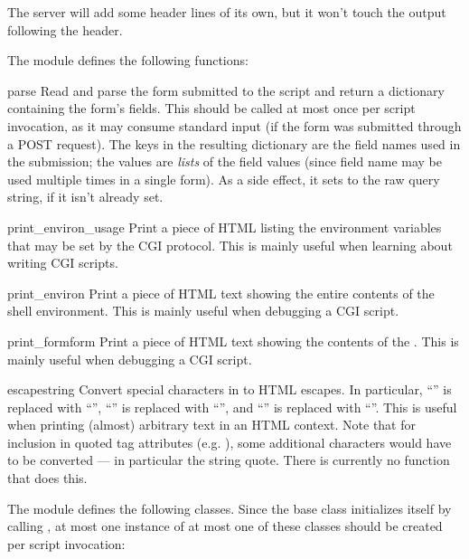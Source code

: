 The server will add some header lines of its own, but it won't touch
the output following the header.

The  module defines the following functions:

\begin{funcdesc}{parse}{}
Read and parse the form submitted to the script and return a
dictionary containing the form's fields.  This should be called at
most once per script invocation, as it may consume standard input (if
the form was submitted through a POST request).  The keys in the
resulting dictionary are the field names used in the submission; the
values are {\em lists} of the field values (since field name may be
used multiple times in a single form).  As a side effect, it sets
 to the raw query string, if it isn't
already set.
\end{funcdesc}

\begin{funcdesc}{print_environ_usage}{}
Print a piece of HTML listing the environment variables that may be
set by the CGI protocol.
This is mainly useful when learning about writing CGI scripts.
\end{funcdesc}

\begin{funcdesc}{print_environ}{}
Print a piece of HTML text showing the entire contents of the shell
environment.  This is mainly useful when debugging a CGI script.
\end{funcdesc}

\begin{funcdesc}{print_form}{form}
Print a piece of HTML text showing the contents of the .
This is mainly useful when debugging a CGI script.
\end{funcdesc}

\begin{funcdesc}{escape}{string}
Convert special characters in  to HTML escapes.  In
particular, ``\code{\&}'' is replaced with ``'',
``\code{<}'' is replaced with ``'', and ``\code{>}'' is
replaced with ``''.  This is useful when printing (almost)
arbitrary text in an HTML context.  Note that for inclusion in quoted
tag attributes (e.g. ), some additional
characters would have to be converted --- in particular the string
quote.  There is currently no function that does this.
\end{funcdesc}

The module defines the following classes.  Since the base class
initializes itself by calling , at most one instance of
at most one of these classes should be created per script invocation:


